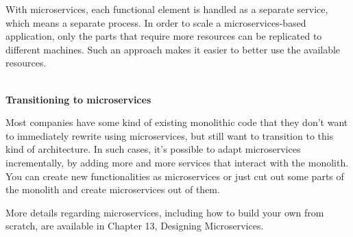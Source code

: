 With microservices, each functional element is handled as a separate service, which means a separate process. In order to scale a microservices-based application, only the parts that require more resources can be replicated to different machines. Such an approach makes it easier to better use the available resources.


\hspace*{\fill} \\ %
\noindent
\textbf{Transitioning to microservices}

Most companies have some kind of existing monolithic code that they don't want to immediately rewrite using microservices, but still want to transition to this kind of architecture. In such cases, it's possible to adapt microservices incrementally, by adding more and more services that interact with the monolith. You can create new functionalities as microservices or just cut out some parts of the monolith and create microservices out of them. 

More details regarding microservices, including how to build your own from scratch, are available in Chapter 13, Designing Microservices.













